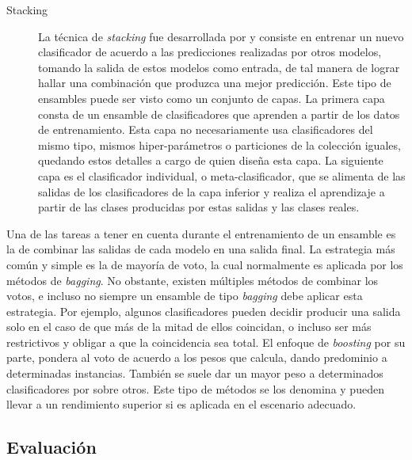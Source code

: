\begin{description}
	\item[Stacking] La técnica de \textit{stacking} fue desarrollada por
	      \citeauthor{wolpert_stacked_1992}\cite{wolpert_stacked_1992} y consiste en
	      entrenar un nuevo clasificador de acuerdo a las predicciones realizadas
	      por otros modelos, tomando la salida de estos modelos como entrada, de tal
	      manera de lograr hallar una combinación que produzca una mejor predicción.
	      Este tipo de ensambles puede ser visto como un conjunto de capas. La
	      primera capa consta de un ensamble de clasificadores que aprenden a partir
	      de los datos de entrenamiento. Esta capa no necesariamente usa
	      clasificadores del mismo tipo, mismos hiper-parámetros o particiones de la
	      colección iguales, quedando estos detalles a cargo de quien diseña esta
	      capa. La siguiente capa es el clasificador individual, o
	      meta-clasificador, que se alimenta de las salidas de los clasificadores de
	      la capa inferior y realiza el aprendizaje a partir de las clases
	      producidas por estas salidas y las clases reales.

\end{description}

Una de las tareas a tener en cuenta durante el entrenamiento de un ensamble es
la de combinar las salidas de cada modelo en una salida final. La estrategia más
común y simple es la de mayoría de voto, la cual normalmente es aplicada por los
métodos de \textit{bagging}. No obstante, existen múltiples métodos de combinar
los votos, e incluso no siempre un ensamble de tipo \textit{bagging} debe
aplicar esta estrategia. Por ejemplo, algunos clasificadores pueden decidir
producir una salida solo en el caso de que más de la mitad de ellos coincidan, o
incluso ser más restrictivos y obligar a que la coincidencia sea total. El
enfoque de \textit{boosting} por su parte, pondera al voto de acuerdo a los
pesos que calcula, dando predominio a determinadas instancias.  También se suele
dar un mayor peso a determinados clasificadores por sobre otros. Este tipo de
métodos se los denomina  y pueden llevar a
un rendimiento superior si es aplicada en el escenario adecuado.



\subsection{Evaluación}
\label{evaluacion_intro}

